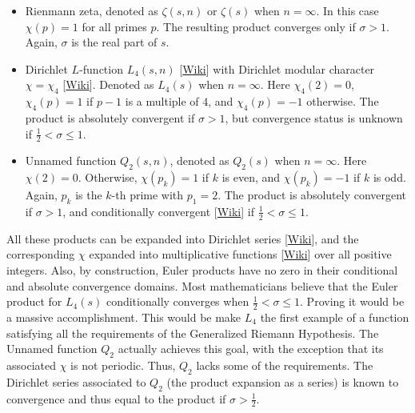 \documentclass[oneside,10pt]{book}
\begin{document}
\begin{itemize} 
\item Rienmann zeta, denoted as $\zeta(s, n)$ or $\zeta(s)$ when $n=\infty$. In this case $\chi(p)= 1$ for all primes $p$. The resulting
 product converges only if $\sigma > 1$. Again, $\sigma$ is the real part of $s$.
\item \textcolor{index}{Dirichlet $L$-function}  $L_4(s,n)$ 
 [\href{https://en.wikipedia.org/wiki/Dirichlet_L-function}{Wiki}] with 
\textcolor{index}{Dirichlet modular character} $\chi=\chi_4$ [\href{https://en.wikipedia.org/wiki/Dirichlet_character}{Wiki}]. Denoted as $L_4(s)$ when $n=\infty$. Here $\chi_4(2) = 0$, $\chi_4(p)= 1$ if $p-1$ is a multiple of $4$, and $\chi_4(p)=-1$ otherwise.
The product is absolutely convergent if $\sigma>1$, but convergence status is unknown if $\frac{1}{2} < \sigma \leq 1$.
\item Unnamed function $Q_2(s, n)$, denoted as $Q_2(s)$ when $n=\infty$.
 Here $\chi(2)=0$. Otherwise, $\chi(p_k) = 1 $ if $k$ is even, and $\chi(p_k)=-1$ if $k$ is odd. 
Again, $p_k$ is the $k$-th prime with $p_1=2$. The product is absolutely convergent if $\sigma>1$,
 and \textcolor{index}{conditionally convergent} [\href{https://en.wikipedia.org/wiki/Conditional_convergence}{Wiki}] if $\frac{1}{2} < \sigma \leq 1$.
\end{itemize} \vspace{1ex}
All these products can be expanded into \textcolor{index}{Dirichlet series} [\href{https://en.wikipedia.org/wiki/Dirichlet_series}{Wiki}], and the corresponding $\chi$ 
 expanded into
 \textcolor{index}{multiplicative functions} [\href{https://en.wikipedia.org/wiki/Completely_multiplicative_function}{Wiki}] over all positive integers.
 Also, by construction, Euler products have no zero in their conditional and absolute convergence domains.
Most mathematicians believe that the Euler product for $L_4(s)$ conditionally converges when $\frac{1}{2}<\sigma \leq 1$.
 Proving it would be a massive accomplishment. This would be make $L_4$ the first example of a function satisfying all the requirements of the Generalized Riemann Hypothesis.
The Unnamed function $Q_2$ actually achieves this goal, with the exception that its associated $\chi$ is not periodic. Thus,
 $Q_2$ lacks some of the requirements.  The Dirichlet series associated to $Q_2$ (the product expansion as a series) is known to convergence and
 thus equal to the product if $\sigma > \frac{1}{2}$.  
\end{document}
